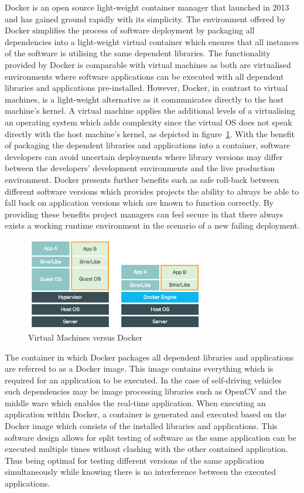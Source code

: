 Docker is an open source light-weight container manager that launched in 2013 and has gained ground rapidly with its simplicity. The environment offered by Docker simplifies the process of software deployment by packaging all dependencies into a light-weight virtual container which ensures that all instances of the software is utilising the same dependent libraries. The functionality provided by Docker is comparable with virtual machines as both are virtualised environments where software applications can be executed with all dependent libraries and applications pre-installed. However, Docker, in contrast to virtual machines, is a light-weight alternative as it communicates directly to the host machine's kernel. A virtual machine applies the additional levels of a virtualising an operating system which adds complexity since the virtual OS does not speak directly with the host machine's kernel, as depicted in figure~\ref{dockervm}. With the benefit of packaging the dependent libraries and applications into a container, software developers can avoid uncertain deployments where library versions may differ between the developers' development environments and the live production environment. Docker presents further benefits such as safe roll-back between different software versions which provides projects the ability to always be able to fall back on application versions which are known to function correctly. By providing these benefits project managers can feel secure in that there always exists a working runtime environment in the scenario of a new failing deployment.\\

\begin{figure}[ht]
\centering
     \includegraphics[width=0.7\textwidth]{./figure/dockervm.png}
      \caption{Virtual Machines versus Docker \cite{whatdocker}}
       \label{dockervm}
\end{figure}


The container in which Docker packages all dependent libraries and applications are referred to as a Docker image. This image contains everything which is required for an application to be executed. In the case of self-driving vehicles such dependencies may be image processing libraries such as OpenCV and the middle ware which enables the real-time application. When executing an application within Docker, a container is generated and executed based on the Docker image which consists of the installed libraries and applications. This software design allows for split testing of software as the same application can be executed multiple times without clashing with the other contained application. Thus being optimal for testing different versions of the same application simultaneously while knowing there is no interference between the executed applications.


